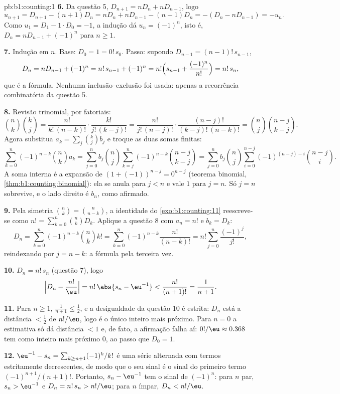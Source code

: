 \begin{solution}{pb:b1:counting:1}
\textbf{6.} Da questão 5, $D_{n+1} = nD_n + nD_{n-1}$, logo
\[
u_{n+1} = D_{n+1} - (n+1)D_n = nD_n + nD_{n-1} - (n+1)D_n
= -(D_n - nD_{n-1}) = -u_n .
\]
Como $u_1 = D_1 - 1 \cdot D_0 = -1$, a indução dá $u_n =
(-1)^n$, isto é, $D_n = nD_{n-1} + (-1)^n$ para $n \geq 1$.

\textbf{7.} Indução em $n$. Base: $D_0 = 1 = 0!\,s_0$. Passo:
supondo $D_{n-1} = (n-1)!\,s_{n-1}$,
\[
D_n = nD_{n-1} + (-1)^n = n!\,s_{n-1} + (-1)^n
= n!\Bigl(s_{n-1} + \frac{(-1)^n}{n!}\Bigr) = n!\,s_n ,
\]
que é a fórmula. Nenhuma inclusão--exclusão foi usada: apenas a
recorrência combinatória da questão 5.

\textbf{8.} Revisão trinomial, por fatoriais:
\[
\binom nk \binom kj
= \frac{n!}{k!\,(n-k)!} \cdot \frac{k!}{j!\,(k-j)!}
= \frac{n!}{j!\,(n-j)!} \cdot \frac{(n-j)!}{(k-j)!\,(n-k)!}
= \binom nj \binom{n-j}{k-j} .
\]
Agora substitua $a_k = \sum_j \binom kj b_j$ e troque as duas
somas finitas:
\[
\sum_{k=0}^{n} (-1)^{n-k} \binom nk a_k
= \sum_{j=0}^{n} b_j \binom nj
\sum_{k=j}^{n} (-1)^{n-k} \binom{n-j}{k-j}
= \sum_{j=0}^{n} b_j \binom nj
\sum_{i=0}^{n-j} (-1)^{(n-j)-i} \binom{n-j}{i} .
\]
A soma interna é a expansão de $(1 + (-1))^{n-j} = 0^{n-j}$
(teorema binomial, \cref{thm:b1:counting:binomial}): ela se anula
para $j < n$ e vale $1$ para $j = n$. Só $j = n$ sobrevive, e
o lado direito é $b_n$, como afirmado.

\textbf{9.} Pela simetria $\binom nk = \binom n{n-k}$, a
identidade do \cref{exo:b1:counting:11} reescreve-se como $n! =
\sum_{k=0}^n \binom nk D_k$. Aplique a questão 8 com $a_n = n!$ e
$b_k = D_k$:
\[
D_n = \sum_{k=0}^{n} (-1)^{n-k} \binom nk k!
= \sum_{k=0}^{n} (-1)^{n-k} \frac{n!}{(n-k)!}
= n! \sum_{j=0}^{n} \frac{(-1)^j}{j!} ,
\]
reindexando por $j = n - k$: a fórmula pela terceira vez.

\textbf{10.} $D_n = n!\,s_n$ (questão 7), logo
\[
\Bigl| D_n - \frac{n!}{\eu} \Bigr|
= n!\,\abs{s_n - \eu^{-1}} < \frac{n!}{(n+1)!} = \frac1{n+1} .
\]

\textbf{11.} Para $n \geq 1$, $\frac1{n+1} \leq \frac12$, e a
desigualdade da questão 10 é estrita: $D_n$ está a distância
$< \frac12$ de $n!/\eu$, logo é o único inteiro mais próximo. Para
$n = 0$ a estimativa só dá distância $< 1$ e, de fato, a afirmação
falha aí: $0!/\eu \approx 0.368$ tem como inteiro mais próximo $0$, ao passo que
$D_0 = 1$.

\textbf{12.} $\eu^{-1} - s_n = \sum_{k \geq n+1} (-1)^k/k!$ é uma
série alternada com termos estritamente decrescentes, de modo que o seu
sinal é o sinal do primeiro termo $(-1)^{n+1}/(n+1)!$. Portanto, $s_n -
\eu^{-1}$ tem o sinal de $(-1)^n$: para $n$ par, $s_n > \eu^{-1}$
e $D_n = n!\,s_n > n!/\eu$; para $n$ ímpar, $D_n < n!/\eu$.


\end{solution}
